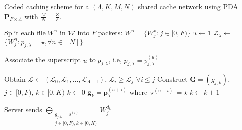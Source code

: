 \documentclass[conference,a4paper,10pt]{IEEEtran}
\newtheorem{example}{Example}
\begin{document}
\begin{algorithm}
	\renewcommand{\thealgorithm}{2}
	\caption{Coded caching scheme for a $(\Lambda,K,M,N)$ shared cache network using PDA $\mathbf{P}_{F \times \Lambda}$ with $\frac{M}{N}=\frac{Z}{F}$. }
	\begin{algorithmic}[1]
		
		\State Split each file $W^n$ in $\mathcal{W}$ into $F$ packets: $W^n =\{W^n_j: j \in [0,F)\}$
		\State $u \gets 1$
		\For{\texttt{$\lambda \in [0,\Lambda)$}}
		\For{\texttt{$j \in [0,F)$}}
		\State  $\mathcal{Z}_{\lambda} \gets $ $\{W^n_{j}: p_{j,\lambda}=\star, \forall n \in [N]\}$
		
		\State Associate the superscript $u$ to $p_{j,\lambda}$, i.e, $p_{j,\lambda} = p_{j,\lambda}^{(u)}$
		\EndIf
		\EndFor
		\EndFor
		\EndProcedure
		
		\State Obtain $\mathcal{L} \gets (\mathcal{L}_0, \mathcal{L}_1,\ldots, \mathcal{L}_{\Lambda-1})$, $\mathcal{L}_i \geq \mathcal{L}_j$ $\forall i \leq j$ 
		\State Construct $\mathbf{G} = (g_{j,k}),$ $j \in [0,F)$, $k \in [0,K)$
		\State $k \gets 0$ 
		\For {$\lambda \in [0,\Lambda)$}
		\For {$i \in [0,\mathcal{L}_{\lambda})$}
		\State $\mathbf{g}_k = \mathbf{p}_{\lambda}^{(u+i)}$ where $\star^{(u+i)}=\star$
		\State $k \gets k+1$		   		
		\EndFor
		\EndIf
		\EndFor
		\EndProcedure	
		
		
		\For{\texttt{$s \in [0,S)$}}
		\State Server sends $\underset{\substack{g_{j,k}=s^{(i)}\\ j \in [0,F),k\in[0,K)}}{\bigoplus}W^{d_k}_j$
		\EndIf
		\EndFor
		\EndFor    
		\EndProcedure
	\end{algorithmic}
\end{algorithm}






\begin{comment}
\begin{example}
It can be checked that the following array given below is a generalized PDA.
\begin{center}
$\begin{pmatrix}
\star & \star & 0^{(1)} & 0^{(2)} & 1^{(1)} & 1^{(2)}\\
0^{(1)} & 0^{(2)} & \star & \star & 2^{(1)} & 2^{(2)}\\
1^{(1)} & 1^{(2)} & 2^{(1)} & 2^{(2)} & \star & \star
\end{pmatrix}$	
\end{center}

\end{example}
\end{comment}
\end{document}
